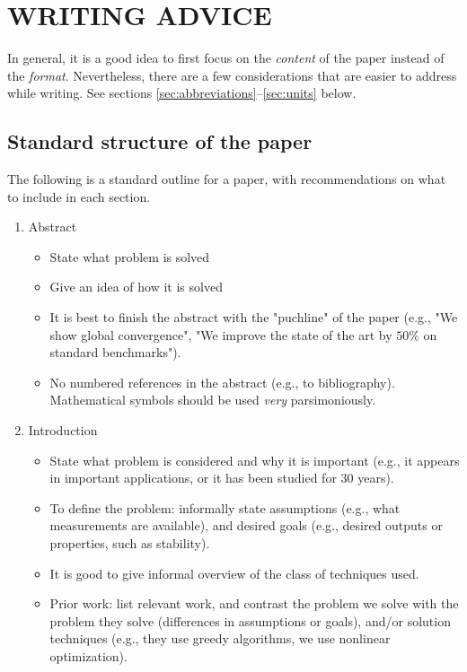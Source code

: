 \documentclass[letterpaper, 10 pt, conference]{ieeeconf}
\begin{document}
\section{WRITING ADVICE}

In general, it is a good idea to first focus on the \emph{content} of the paper instead of the \emph{format}. Nevertheless, there are a few considerations that are easier to address while writing. See sections \ref{sec:abbreviations}--\ref{sec:units} below.

\subsection{Standard structure of the paper}
The following is a standard outline for a paper, with recommendations on what to include in each section.
\begin{enumerate}
\item Abstract
  \begin{itemize}
  \item State what problem is solved
  \item Give an idea of how it is solved
  \item It is best to finish the abstract with the "puchline" of the paper (e.g., "We show global convergence", "We improve the state of the art by $50\%$ on standard benchmarks").
  \item No numbered references in the abstract (e.g., to bibliography). Mathematical symbols should be used \emph{very} parsimoniously.
  \end{itemize}
\item Introduction
  \begin{itemize}
  \item State what problem is considered and why it is important (e.g., it
    appears in important applications, or it has been studied for 30 years).
  \item To define the problem: informally state assumptions (e.g., what measurements are available), and desired goals (e.g., desired outputs or properties, such as stability).
  \item It is good to give informal overview of the class of techniques used.
  \item Prior work: list relevant work, and contrast the problem we solve with the problem they solve (differences in assumptions or goals), and/or solution techniques (e.g., they use greedy algorithms, we use nonlinear optimization). 

\end{itemize}
\end{enumerate}
\end{document}
